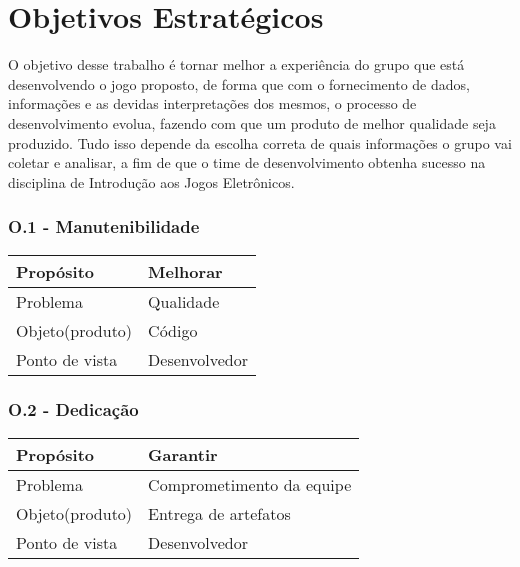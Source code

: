 \chapter{Objetivos Estratégicos}
	O objetivo desse trabalho é tornar melhor a experiência do grupo que está desenvolvendo o jogo proposto, de forma que com o fornecimento de dados, informações e as devidas interpretações dos mesmos, o processo de desenvolvimento evolua, fazendo com que um produto de melhor qualidade seja produzido. Tudo isso depende da escolha correta de quais informações o grupo vai coletar e analisar, a fim de que o time de desenvolvimento obtenha sucesso na disciplina de Introdução aos Jogos Eletrônicos.

\subsection{O.1 - Manutenibilidade}

	\begin{tabular}{ |p{5cm}|p{5cm}|  }
	 \hline
	 Propósito 		& 		Melhorar \\
	 \hline
	 Problema 		& 		Qualidade \\
	 \hline
	 Objeto(produto) 		& 		Código \\
	 \hline
	 Ponto de vista 		& 		Desenvolvedor \\
	 \hline
	\end{tabular}

\subsection{O.2 - Dedicação}

	\begin{tabular}{ |p{5cm}|p{5cm}|  }
	 \hline
	 Propósito 		& 		Garantir \\
	 \hline
	 Problema 		& 		Comprometimento da equipe \\
	 \hline
	 Objeto(produto) 		& 		Entrega de artefatos \\
	 \hline
	 Ponto de vista 		& 		Desenvolvedor \\
	 \hline	
	\end{tabular}


